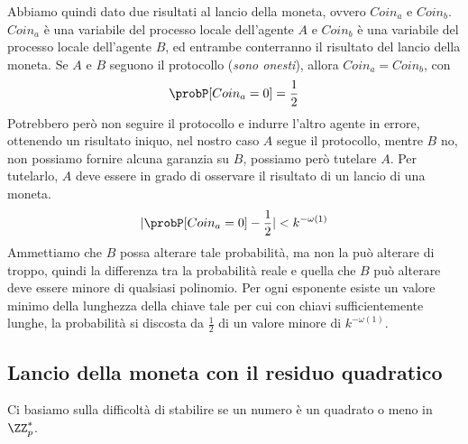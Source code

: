 Abbiamo quindi dato due risultati al lancio della moneta, ovvero
$Coin_a$ e $Coin_b$. $Coin_a$ è una variabile del processo locale dell'agente
$A$ e $Coin_b$ è una variabile del processo locale dell'agente $B$, ed entrambe
conterranno il risultato del lancio della moneta. Se $A$ e $B$ seguono 
il protocollo (\textit{sono onesti}), allora $Coin_a = Coin_b$, con 
\[
  \probP[Coin_a = 0] = \frac{1}{2}
\]
Potrebbero però non seguire il protocollo e indurre l'altro agente in errore, ottenendo 
un risultato iniquo, nel nostro caso $A$ segue il protocollo, mentre $B$ no, non possiamo 
fornire alcuna garanzia su $B$, possiamo però tutelare $A$. Per tutelarlo, 
$A$ deve essere in grado di osservare il risultato di un lancio di una 
moneta.
\[
  | \probP[Coin_a = 0] - \frac{1}{2} | < k^{-\omega(1)}
\]
Ammettiamo che $B$ possa alterare tale probabilità, ma non la può alterare di troppo,
quindi la differenza tra la probabilità reale e quella che $B$ può alterare deve essere
minore di qualsiasi polinomio. Per ogni esponente esiste un valore minimo della 
lunghezza della chiave tale per cui con chiavi sufficientemente lunghe, 
la probabilità si discosta da $\frac{1}{2}$ di un valore minore di $k^{-\omega(1)}$.
\subsection{Lancio della moneta con il residuo quadratico}
Ci basiamo sulla difficoltà di stabilire se un numero è un quadrato o meno in $\ZZ_p^*$.


